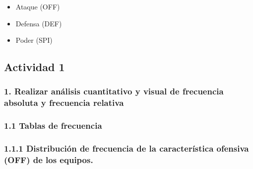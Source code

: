 \documentclass[]{article}
\newenvironment{Shaded}{\begin{snugshade}}{\end{snugshade}}
\newcommand{\CommentTok}[1]{\textcolor[rgb]{0.56,0.35,0.01}{\textit{#1}}}
\newcommand{\DataTypeTok}[1]{\textcolor[rgb]{0.13,0.29,0.53}{#1}}
\newcommand{\KeywordTok}[1]{\textcolor[rgb]{0.13,0.29,0.53}{\textbf{#1}}}
\newcommand{\NormalTok}[1]{#1}
\newcommand{\OperatorTok}[1]{\textcolor[rgb]{0.81,0.36,0.00}{\textbf{#1}}}
\newcommand{\OtherTok}[1]{\textcolor[rgb]{0.56,0.35,0.01}{#1}}
\newcommand{\StringTok}[1]{\textcolor[rgb]{0.31,0.60,0.02}{#1}}
\providecommand{\tightlist}{%
  \setlength{\itemsep}{0pt}\setlength{\parskip}{0pt}}
\begin{document}
\begin{itemize}
\tightlist
\item
  Ataque (OFF)
\item
  Defensa (DEF)
\item
  Poder (SPI)
\end{itemize}

\hypertarget{actividad-1}{%
\subsection{Actividad 1}\label{actividad-1}}

\hypertarget{realizar-analisis-cuantitativo-y-visual-de-frecuencia-absoluta-y-frecuencia-relativa}{%
\subsubsection{1. Realizar análisis cuantitativo y visual de frecuencia
absoluta y frecuencia
relativa}\label{realizar-analisis-cuantitativo-y-visual-de-frecuencia-absoluta-y-frecuencia-relativa}}

\hypertarget{tablas-de-frecuencia}{%
\subsubsection{1.1 Tablas de frecuencia}\label{tablas-de-frecuencia}}

\hypertarget{distribucion-de-frecuencia-de-la-caracteristica-ofensiva-off-de-los-equipos.}{%
\subsubsection{1.1.1 Distribución de frecuencia de la característica
ofensiva (OFF) de los
equipos.}\label{distribucion-de-frecuencia-de-la-caracteristica-ofensiva-off-de-los-equipos.}}

\begin{Shaded}
\end{Shaded}
\end{document}
